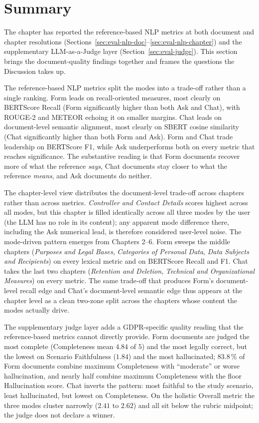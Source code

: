 \section{Summary}
\label{sec:nlp-summary}

The chapter has reported the reference-based NLP metrics at both
document and chapter resolutions
(Sections~\ref{sec:eval-nlp-doc}--\ref{sec:eval-nlp-chapter}) and
the supplementary LLM-as-a-Judge layer (Section~\ref{sec:eval-judge}).
This section brings the document-quality findings together and
frames the questions the Discussion takes up.

The reference-based NLP metrics split the modes into a trade-off
rather than a single ranking. Form leads on recall-oriented
measures, most clearly on BERTScore Recall (Form significantly
higher than both Ask and Chat), with ROUGE-2 and METEOR echoing
it on smaller margins. Chat leads on document-level semantic
alignment, most clearly on SBERT cosine similarity (Chat
significantly higher than both Form and Ask). Form and Chat
trade leadership on BERTScore F1, while Ask underperforms both on
every metric that reaches significance.
The substantive reading is that Form documents recover more of
what the reference \emph{says}, Chat documents stay closer to
what the reference \emph{means}, and Ask documents do neither.

\sloppy
The chapter-level view distributes the document-level trade-off
across chapters rather than across metrics. \emph{Controller and
Contact Details} scores highest across all modes, but this
chapter is filled identically across all three modes by the
user (the LLM has no role in its content); any
apparent mode difference there, including the Ask numerical
lead, is therefore considered user-level noise.
The mode-driven pattern emerges from Chapters 2--6. Form
sweeps the middle chapters (\emph{Purposes and Legal Bases},
\emph{Categories of Personal Data}, \emph{Data Subjects and
Recipients}) on every lexical metric and on BERTScore Recall
and F1. Chat takes the last two chapters (\emph{Retention and
Deletion}, \emph{Technical and Organizational Measures}) on
every metric. The same trade-off that produces Form's
document-level recall edge and Chat's document-level semantic
edge thus appears at the chapter level as a clean two-zone split
across the chapters whose content the modes actually drive.

The supplementary judge layer adds a GDPR-specific
quality reading that the reference\hspace{0pt}-based
metrics cannot directly provide. Form documents are judged the most
complete (Completeness mean $4.84$ of $5$) and the most legally
correct, but the lowest on Scenario Faithfulness ($1.84$) and the
most hallucinated; $83.8\,\%$ of Form documents combine maximum
Completeness with ``moderate'' or worse hallucination, and nearly
half combine maximum Completeness with the floor Hallucination
score. Chat inverts the pattern: most faithful to the study
scenario, least hallucinated, but lowest on Completeness. On the
holistic Overall metric the three modes cluster narrowly ($2.41$
to $2.62$) and all sit below the rubric midpoint; the judge does
not declare a winner.
\fussy


